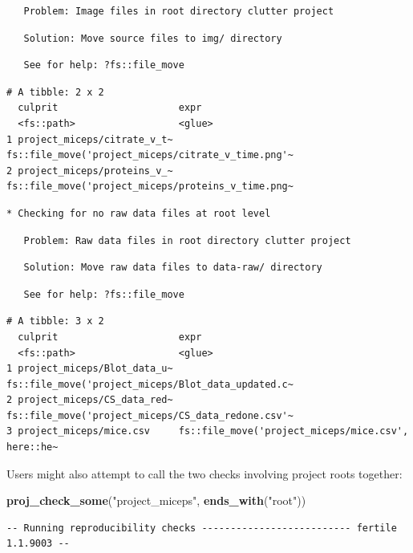 \documentclass[12pt,twoside]{reedthesis}
\newenvironment{Shaded}{\begin{snugshade}}{\end{snugshade}}
\newcommand{\KeywordTok}[1]{\textcolor[rgb]{0.13,0.29,0.53}{\textbf{#1}}}
\newcommand{\NormalTok}[1]{#1}
\newcommand{\StringTok}[1]{\textcolor[rgb]{0.31,0.60,0.02}{#1}}
\begin{document}
\begin{verbatim}
   Problem: Image files in root directory clutter project
\end{verbatim}
\begin{verbatim}
   Solution: Move source files to img/ directory
\end{verbatim}
\begin{verbatim}
   See for help: ?fs::file_move
\end{verbatim}
\begin{verbatim}
# A tibble: 2 x 2
  culprit                     expr                                              
  <fs::path>                  <glue>                                            
1 project_miceps/citrate_v_t~ fs::file_move('project_miceps/citrate_v_time.png'~
2 project_miceps/proteins_v_~ fs::file_move('project_miceps/proteins_v_time.png~
\end{verbatim}
\begin{verbatim}
* Checking for no raw data files at root level
\end{verbatim}
\begin{verbatim}
   Problem: Raw data files in root directory clutter project
\end{verbatim}
\begin{verbatim}
   Solution: Move raw data files to data-raw/ directory
\end{verbatim}
\begin{verbatim}
   See for help: ?fs::file_move
\end{verbatim}
\begin{verbatim}
# A tibble: 3 x 2
  culprit                     expr                                              
  <fs::path>                  <glue>                                            
1 project_miceps/Blot_data_u~ fs::file_move('project_miceps/Blot_data_updated.c~
2 project_miceps/CS_data_red~ fs::file_move('project_miceps/CS_data_redone.csv'~
3 project_miceps/mice.csv     fs::file_move('project_miceps/mice.csv', here::he~
\end{verbatim}
Users might also attempt to call the two checks involving project roots together:
\begin{Shaded}
\begin{Highlighting}[]
\KeywordTok{proj_check_some}\NormalTok{(}\StringTok{"project_miceps"}\NormalTok{, }\KeywordTok{ends_with}\NormalTok{(}\StringTok{"root"}\NormalTok{))}
\end{Highlighting}
\end{Shaded}
\begin{verbatim}
-- Running reproducibility checks -------------------------- fertile 1.1.9003 --
\end{verbatim}
\end{document}
